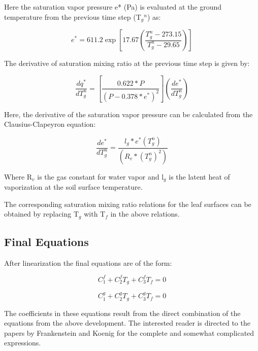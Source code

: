 Here the saturation vapor pressure e* (Pa) is evaluated at the ground temperature from the previous time step (T\(_{g}\)\(^{n}\)) as:

\begin{equation}
{e^*} = 611.2\exp \left[ {17.67\left( {\frac{{T_g^n - 273.15}}{{T_g^n - 29.65}}} \right)} \right]
\end{equation}

The derivative of saturation mixing ratio at the previous time step is given by:

\begin{equation}
\frac{{d{q^ * }}}{{dT_g^n}} = \left[ {\frac{{0.622 * P}}{{{{\left( {P - 0.378 * {e^ * }} \right)}^2}}}} \right]\left( {\frac{{d{e^ * }}}{{dT_g^n}}} \right)
\end{equation}

Here, the derivative of the saturation vapor pressure can be calculated from the Clausius-Clapeyron equation:

\begin{equation}
\frac{{d{e^ * }}}{{dT_g^n}} = \frac{{{l_g} * {e^ * }\left( {T_g^n} \right)}}{{\left( {{R_v} * {{\left( {T_g^n} \right)}^2}} \right)}}
\end{equation}

Where R\(_{v}\) is the gas constant for water vapor and l\(_{g}\) is the latent heat of vaporization at the soil surface temperature.

The corresponding saturation mixing ratio relations for the leaf surfaces can be obtained by replacing T\(_{g}\) with T\(_{f}\) in the above relations.

\subsection{Final Equations}\label{final-equations}

After linearization the final equations are of the form:

\begin{equation}
C_1^f + C_2^f{T_g} + C_3^f{T_f} = 0
\end{equation}

\begin{equation}
C_1^g + C_2^g{T_g} + C_3^g{T_f} = 0
\end{equation}

The coefficients in these equations result from the direct combination of the equations from the above development. The interested reader is directed to the papers by Frankenstein and Koenig for the complete and somewhat complicated expressions.

